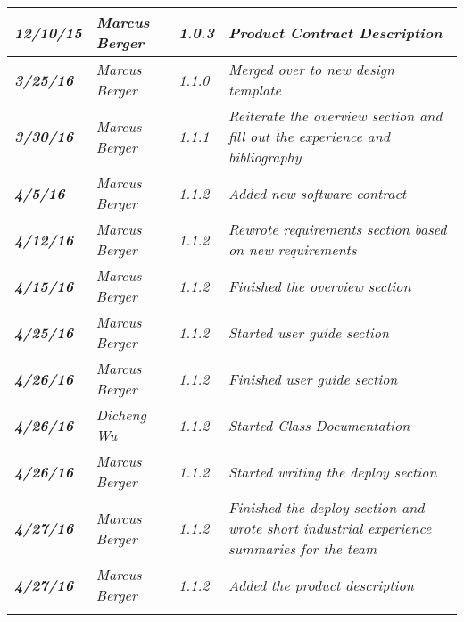 \begin{tabular}{|>{\raggedright}p{1.5cm}|>{\raggedright}p{3cm}|>{\raggedright}p{1.5cm}|>{\raggedright}p{9cm}|}
\hline
\textit{\textbf{12/10/15}} & \textit{Marcus Berger} & \textit{1.0.3} & \textit{Product Contract Description}\tabularnewline
\hline
\textit{\textbf{3/25/16}} & \textit{Marcus Berger} & \textit{1.1.0} & \textit{Merged over to new design template}\tabularnewline
\hline
\textit{\textbf{3/30/16}} & \textit{Marcus Berger} & \textit{1.1.1} & \textit{Reiterate the overview section and fill out the experience and bibliography}\tabularnewline
\hline
\textit{\textbf{4/5/16}} & \textit{Marcus Berger} & \textit{1.1.2} & \textit{Added new software contract}\tabularnewline
\hline
\textit{\textbf{4/12/16}} & \textit{Marcus Berger} & \textit{1.1.2} & \textit{Rewrote requirements section based on new requirements }\tabularnewline
\hline
\textit{\textbf{4/15/16}} & \textit{Marcus Berger} & \textit{1.1.2} & \textit{Finished the overview section}\tabularnewline
\hline
\textit{\textbf{4/25/16}} & \textit{Marcus Berger} & \textit{1.1.2} & \textit{Started user guide section}\tabularnewline
\hline
\textit{\textbf{4/26/16}} & \textit{Marcus Berger} & \textit{1.1.2} & \textit{Finished user guide section}\tabularnewline
\hline
\textit{\textbf{4/26/16}} & \textit{Dicheng Wu} & \textit{1.1.2} & \textit{Started Class Documentation}\tabularnewline
\hline
\textit{\textbf{4/26/16}} & \textit{Marcus Berger} & \textit{1.1.2} & \textit{Started writing the deploy section}\tabularnewline
\hline
\textit{\textbf{4/27/16}} & \textit{Marcus Berger} & \textit{1.1.2} & \textit{Finished the deploy section and wrote short industrial experience summaries for the team}\tabularnewline
\hline
\textit{\textbf{4/27/16}} & \textit{Marcus Berger} & \textit{1.1.2} & \textit{Added the product description}\tabularnewline
\hline
 &  &  & \tabularnewline
\hline
\end{tabular}
\vfill

